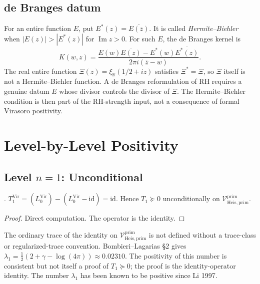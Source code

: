 \subsection{de Branges datum}
\label{v4-arith:vb:cycle:A6}

For an entire function \(E\), put
\(E^*(z)=\overline{E(\overline z)}\). It is called
\emph{Hermite--Biehler} when \(|E(z)|>|E^*(z)|\) for
\(\operatorname{Im}z>0\). For such \(E\), the de Branges kernel is
\[
K(w,z)=\frac{E(w)\overline{E(z)}-E^{*}(w)\overline{E^{*}(z)}}
{2\pi i(\overline z-w)}.
\]
The real entire function
\(\Xi(z)=\xi_{\mathbb R}(1/2+iz)\) satisfies \(\Xi^{*}=\Xi\), so
\(\Xi\) itself is not a Hermite--Biehler function. A de Branges
reformulation of RH requires a genuine datum \(E\) whose divisor
controls the divisor of \(\Xi\). The Hermite--Biehler condition is then
part of the RH-strength input, not a consequence of formal Virasoro
positivity.

\section{Level-by-Level Positivity}
\label{v4-arith:vb:level-closure}

\subsection{Level \(n=1\): Unconditional}
\label{v4-arith:vb:n=1}

\begin{theorem}[\(n=1\) arithmetic Virasoro positivity]
\label{v4-arith:vb:thm:n=1}
\ClaimStatusProvedHere. \(T_{1}^{\mathrm{Vir}}=(L_{0}^{\mathrm{Vir}})-(L_{0}^{\mathrm{Vir}}-\mathrm{id})=\mathrm{id}\).
Hence \(T_{1}\succeq 0\) unconditionally on
\(\mathcal{V}^{\mathrm{prim}}_{\mathrm{Heis},\mathrm{prim}}\).
\end{theorem}

\begin{proof}
Direct computation. The operator is the identity.
\end{proof}

\begin{remark}
\label{v4-arith:vb:rem:n=1-consistency}
The ordinary trace of the identity on
\(\mathcal{V}^{\mathrm{prim}}_{\mathrm{Heis},\mathrm{prim}}\) is not
defined without a trace-class or regularized-trace convention.
Bombieri--Lagarias \S2 gives
\(\lambda_{1}=\tfrac{1}{2}(2+\gamma-\log(4\pi))\approx 0.02310\). The
positivity of this number is consistent but not itself a proof of
\(T_{1}\succeq 0\); the proof is the identity-operator identity.
The number \(\lambda_{1}\) has been known to be positive since Li 1997.
\end{remark}

